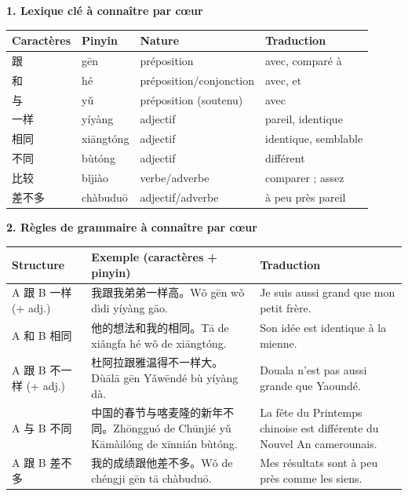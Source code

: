 \documentclass[11pt]{article}
\begin{document}
\begin{bilan}
\textbf{1. Lexique clé à connaître par cœur}

\begin{center}
\begin{tabularx}{\linewidth}{|X|X|X|X|}\hline
\rowcolor{popblueL} Caractères & Pinyin & Nature & Traduction \\ \hline
跟 & gēn & préposition & avec, comparé à \\ \hline
和 & hé & préposition/conjonction & avec, et \\ \hline
与 & yǔ & préposition (soutenu) & avec \\ \hline
一样 & yíyàng & adjectif & pareil, identique \\ \hline
相同 & xiāngtóng & adjectif & identique, semblable \\ \hline
不同 & bùtóng & adjectif & différent \\ \hline
比较 & bǐjiào & verbe/adverbe & comparer ; assez \\ \hline
差不多 & chàbuduō & adjectif/adverbe & à peu près pareil \\ \hline
\end{tabularx}
\end{center}

\textbf{2. Règles de grammaire à connaître par cœur}

\begin{center}
\begin{tabularx}{\linewidth}{|X|X|X|}\hline
\rowcolor{popblueL} Structure & Exemple (caractères + pinyin) & Traduction \\ \hline
A 跟 B 一样 (+ adj.) & 我跟我弟弟一样高。Wǒ gēn wǒ dìdi yíyàng gāo. & Je suis aussi grand que mon petit frère. \\ \hline
A 和 B 相同 & 他的想法和我的相同。Tā de xiǎngfa hé wǒ de xiāngtóng. & Son idée est identique à la mienne. \\ \hline
A 跟 B 不一样 (+ adj.) & 杜阿拉跟雅温得不一样大。Dùālā gēn Yǎwēndé bù yíyàng dà. & Douala n'est pas aussi grande que Yaoundé. \\ \hline
A 与 B 不同 & 中国的春节与喀麦隆的新年不同。Zhōngguó de Chūnjié yǔ Kāmàilóng de xīnnián bùtóng. & La fête du Printemps chinoise est différente du Nouvel An camerounais. \\ \hline
A 跟 B 差不多 & 我的成绩跟他差不多。Wǒ de chéngji gēn tā chàbuduō. & Mes résultats sont à peu près comme les siens. \\ \hline
\end{tabularx}
\end{center}


\end{bilan}
\end{document}
